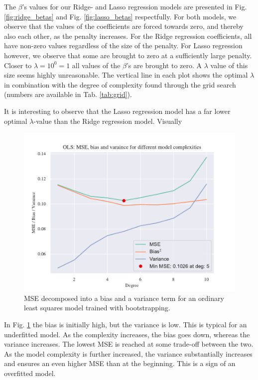 The $\beta$'s values for our Ridge- and Lasso regression models are presented in Fig. \ref{fig:ridge_betas} and Fig. \ref{fig:lasso_betas} respectfully. For both models, we observe that the values of the coefficients are forced towards zero, and thereby also each other, as the penalty increases. For the Ridge regression coefficients, all have non-zero values regardless of the size of the penalty. For Lasso regression however, we observe that some are brought to zero at a sufficiently large penalty. Closer to $\lambda = 10^0 = 1$ all values of the $\beta$'s are brought to zero. A $\lambda$ value of this size seems highly unreasonable. The vertical line in each plot shows the optimal $\lambda$ in combination with the degree of complexity found through the grid search (numbers are available in Tab. \ref{tab:grid}). 

It is interesting to observe that the Lasso regression model has a far lower optimal $\lambda$-value than the Ridge regression model. Visually 

\begin{figure}
    \centering
    \includegraphics[width=1\linewidth]{project_1_alt/figures/figures_in_report/bias_var_Franke_Noise_bootstrap.pdf}
    \caption{MSE decomposed into a bias and a variance term for an ordinary least squares model trained with bootstrapping.
}
    \label{bias_var_trade}
\end{figure}

In Fig. \ref{bias_var_trade} the bias is initially high, but the variance is low. This is typical for an underfitted model. As the complexity increases, the bias goes down, whereas the variance increases. The lowest MSE is reached at some trade-off between the two. As the model complexity is further increased, the variance substantially increases and ensures an even higher MSE than at the beginning. This is a sign of an overfitted model.

